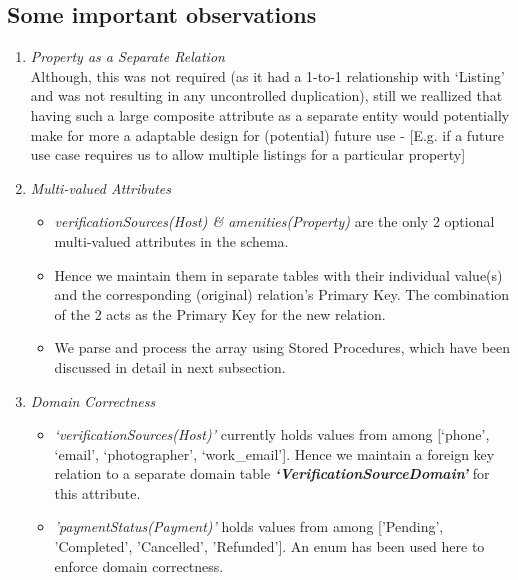 \documentclass[conference]{IEEEtran}
\begin{document}
\subsection{\textbf{Some important observations}}
	\begin{enumerate}
	    \item \textit{Property as a Separate Relation}\\
	        Although, this was not required (as it had a 1-to-1 relationship with ‘Listing’ and was not resulting in any uncontrolled duplication), still we reallized that having such a large composite attribute as a separate entity would potentially make for more a adaptable design for (potential) future use - [E.g. if a future use case requires us to allow multiple listings for a particular property]
	    
	    \vspace{1mm}
	    
	    \item \textit{Multi-valued Attributes}
	        \begin{itemize}
	            \item \textit{verificationSources(Host)  \&  amenities(Property)} are the only 2 optional multi-valued attributes in the schema.
	            \item Hence we maintain them in separate tables with their individual value(s) and the corresponding (original) relation's Primary Key. The combination of the 2 acts as the Primary Key for the new relation.
	            \item We parse and process the array using Stored Procedures, which have been discussed in detail in next subsection.
	        \end{itemize}
	
	    \item \textit{Domain Correctness}
	        \begin{itemize}
    	            \item \textit{‘verificationSources(Host)’} currently holds values from among [‘phone’, ‘email’, ‘photographer’, ‘work\_email’]. Hence we maintain a foreign key relation to a separate domain table \textit{\textbf{‘VerificationSourceDomain’}} for this attribute.
    	            \item \textit{'paymentStatus(Payment)’}  holds values from among ['Pending', 'Completed', 'Cancelled', 'Refunded']. An enum has been used here to enforce domain correctness.
	        \end{itemize}
	

\end{enumerate}
\end{document}
